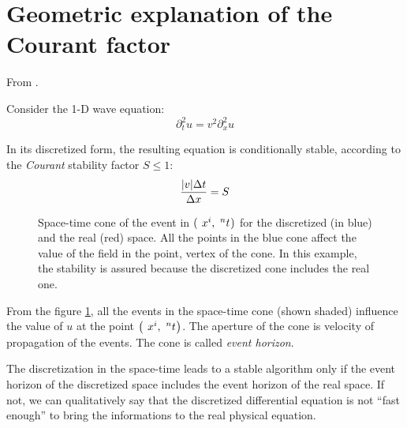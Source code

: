 \section{Geometric explanation of the Courant factor}

From \cite{numerical_recipies}.

Consider the 1-D wave equation:
\begin{equation*}
  \partial_t^2 u = v^2 \partial_x^2 u
\end{equation*}

In its discretized form, the resulting equation is conditionally
stable, according to the \emph{Courant} stability factor $S \leq 1$:
\begin{equation*}
  \frac{\Abs{v}\deltat}{\deltax} = S
\end{equation*}

\begin{figure}[htbp]
  \begin{center}
    \resizebox{8cm}{!}{}
  \end{center}
  \caption{Space-time cone of the event in $(\Disc{x}{i}{},
    \Disc{t}{}{n})$ for the discretized (in blue) and the real
    (red) space. All the points in the blue cone affect the value of
    the field in the point, vertex of the cone. In this example, the
    stability is assured because the discretized cone includes the
    real one.}
  \label{fig:space_time_cone}
\end{figure}

From the figure \ref{fig:space_time_cone}, all the events in the space-time
cone (shown shaded) influence the value of $u$ at the point
$\left(\Disc{x}{i}{},\Disc{t}{}{n}\right)$. The aperture of the cone
is velocity of propagation of the events. The cone is called
\emph{event horizon}.

The discretization in the space-time leads to a stable algorithm only
if the event horizon of the discretized space includes the event
horizon of the real space. If not, we can qualitatively say that the
discretized differential equation is not ``fast enough'' to bring the
informations to the real physical equation.









